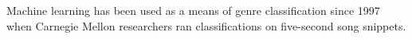 Machine learning has been used as a means of genre classification since 1997 when Carnegie Mellon researchers ran classifications on five-second song snippets\cite{Dannenberg}. 